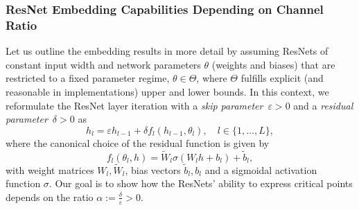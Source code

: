 \documentclass[10pt]{article}
\theoremstyle{definition}
\numberwithin{equation}{section}
\newcommand{\eps}{\varepsilon}
\newcommand{\Wt}{\widetilde{W}}
\newcommand{\bt}{\tilde{b}}
\begin{document}
    \subsubsection*{ResNet Embedding Capabilities Depending on Channel Ratio}
    Let us outline the embedding results in more detail by assuming ResNets of constant input width and network parameters $\theta$ (weights and biases) that are restricted to a fixed parameter regime,  $\theta\in \Theta$, where $\Theta$ fulfills explicit (and reasonable in implementations) upper and lower bounds. In this context, we reformulate the ResNet layer iteration with a \emph{skip parameter}~$\eps> 0$ and a \emph{residual parameter}~$\delta > 0$ as
    \begin{equation}\label{eq:iterationintro}
        h_{l} = \eps h_{l-1} + \delta f_l(h_{l-1}, \theta_l),\quad l\in\{1, \ldots, L\},
    \end{equation}
    where the canonical choice of the residual function is given by
    \begin{equation}\label{eq:introcanonical}
        f_l(\theta_l, h)=\Wt_l \sigma (W_l h + b_l) + \bt_l,
    \end{equation}
    with weight matrices $W_l, \Wt_l$, bias vectors $\bt_l, b_l$ and a sigmoidal activation function $\sigma$. 
    Our goal is to show how the ResNets' ability to express critical points depends on the ratio $\alpha := \frac{\delta}{\eps}>0$. 
\end{document}
